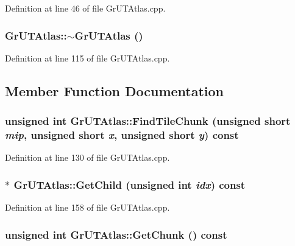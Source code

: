 Definition at line 46 of file GrUTAtlas.cpp.\hypertarget{class_gr_u_t_atlas_2f3072b511b4c916631ff4f2dbb4bd57}{
\subsubsection[{$\sim$GrUTAtlas}]{\setlength{\rightskip}{0pt plus 5cm}GrUTAtlas::$\sim$GrUTAtlas ()}}
\label{class_gr_u_t_atlas_2f3072b511b4c916631ff4f2dbb4bd57}




Definition at line 115 of file GrUTAtlas.cpp.

\subsection{Member Function Documentation}
\hypertarget{class_gr_u_t_atlas_44541528b8f270d2f59d9a89c8d0a331}{
\subsubsection[{FindTileChunk}]{\setlength{\rightskip}{0pt plus 5cm}unsigned int GrUTAtlas::FindTileChunk (unsigned short {\em mip}, \/  unsigned short {\em x}, \/  unsigned short {\em y}) const}}
\label{class_gr_u_t_atlas_44541528b8f270d2f59d9a89c8d0a331}




Definition at line 130 of file GrUTAtlas.cpp.\hypertarget{class_gr_u_t_atlas_ac1053adb8f881c4db9bce7d0ee185d4}{
\subsubsection[{GetChild}]{ $\ast$ GrUTAtlas::GetChild (unsigned int {\em idx}) const}}
\label{class_gr_u_t_atlas_ac1053adb8f881c4db9bce7d0ee185d4}




Definition at line 158 of file GrUTAtlas.cpp.\hypertarget{class_gr_u_t_atlas_8cdc84f1ac50f1d3b2e6f9bc889e9c15}{
\subsubsection[{GetChunk}]{\setlength{\rightskip}{0pt plus 5cm}unsigned int GrUTAtlas::GetChunk () const}}
\label{class_gr_u_t_atlas_8cdc84f1ac50f1d3b2e6f9bc889e9c15}




